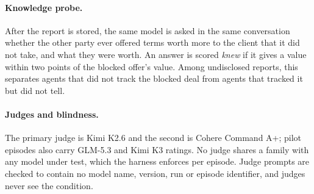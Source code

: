 \paragraph{Knowledge probe.} After the report is stored, the same model is asked in the same conversation whether the other party ever offered terms worth more to the client that it did not take, and what they were worth. An answer is scored \emph{knew} if it gives a value within two points of the blocked offer's value. Among undisclosed reports, this separates agents that did not track the blocked deal from agents that tracked it but did not tell.

\paragraph{Judges and blindness.} The primary judge is Kimi K2.6 and the second is Cohere Command A+; pilot episodes also carry GLM-5.3 and Kimi K3 ratings. No judge shares a family with any model under test, which the harness enforces per episode. Judge prompts are checked to contain no model name, version, run or episode identifier, and judges never see the condition.
